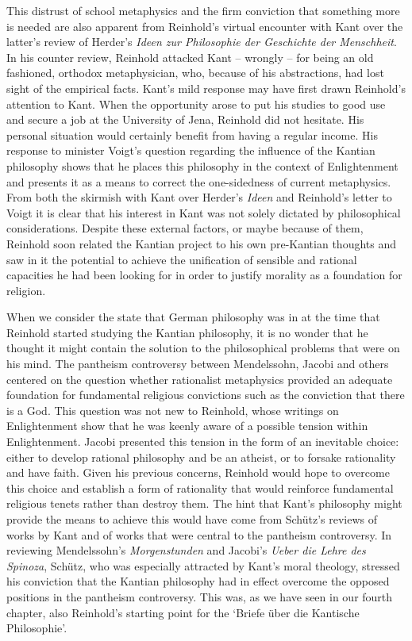 This distrust of school metaphysics and the firm conviction that something more is needed are also apparent from Reinhold's virtual encounter with Kant over the latter's review of Herder's \textit{Ideen zur Philosophie der Geschichte der Menschheit}. In his counter review, Reinhold attacked Kant {--} wrongly {--} for being an old fashioned, orthodox metaphysician, who, because of his abstractions, had lost sight of the empirical facts. Kant's mild response may have first drawn Reinhold's attention to Kant. When the opportunity arose to put his studies to good use and secure a job at the University of Jena, Reinhold did not hesitate. His personal situation would certainly benefit from having a regular income. His response to minister Voigt's question regarding the influence of the Kantian philosophy shows that he places this philosophy in the context of Enlightenment and presents it as a means to correct the one{-}sidedness of current metaphysics. From both the skirmish with Kant over Herder's \textit{Ideen} and Reinhold's letter to Voigt it is clear that his interest in Kant was not solely dictated by philosophical considerations. Despite these external factors, or maybe because of them, Reinhold soon related the Kantian project to his own pre{-}Kantian thoughts and saw in it the potential to achieve the unification of sensible and rational capacities he had been looking for in order to justify morality as a foundation for religion. 

 When we consider the state that German philosophy was in at the time that Reinhold started studying the Kantian philosophy, it is no wonder that he thought it might contain the solution to the philosophical problems that were on his mind. The pantheism controversy between Mendelssohn, Jacobi and others centered on the question whether rationalist metaphysics provided an adequate foundation for fundamental religious convictions such as the conviction that there is a God. This question was not new to Reinhold, whose writings on Enlightenment show that he was keenly aware of a possible tension within Enlightenment. Jacobi presented this tension in the form of an inevitable choice: either to develop rational philosophy and be an atheist, or to forsake rationality and have faith. Given his previous concerns, Reinhold would hope to overcome this choice and establish a form of rationality that would reinforce fundamental religious tenets rather than destroy them. The hint that Kant's philosophy might provide the means to achieve this would have come from Sch\"{u}tz's reviews of works by Kant and of works that were central to the pantheism controversy. In reviewing Mendelssohn's \textit{Morgenstunden} and Jacobi's \textit{Ueber die Lehre des Spinoza}, Sch\"{u}tz, who was especially attracted by Kant's moral theology, stressed his conviction that the Kantian philosophy had in effect overcome the opposed positions in the pantheism controversy. This was, as we have seen in our fourth chapter, also Reinhold's starting point for the `Briefe \"{u}ber die Kantische Philosophie'. 

